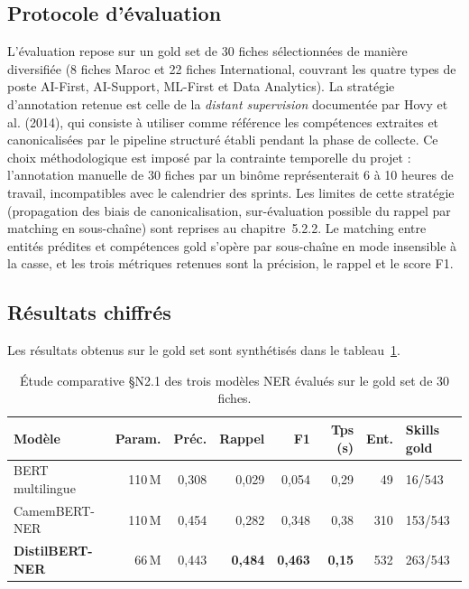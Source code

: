 \documentclass[11pt,a4paper,openany]{report}
\begin{document}
\subsection{Protocole d'\'evaluation}

L'\'evaluation repose sur un gold set de 30 fiches s\'electionn\'ees de mani\`ere diversifi\'ee (8 fiches Maroc et 22 fiches International, couvrant les quatre types de poste AI-First, AI-Support, ML-First et Data Analytics). La strat\'egie d'annotation retenue est celle de la \emph{distant supervision} document\'ee par Hovy et al. (2014), qui consiste \`a utiliser comme r\'ef\'erence les comp\'etences extraites et canonicalis\'ees par le pipeline structur\'e \'etabli pendant la phase de collecte. Ce choix m\'ethodologique est impos\'e par la contrainte temporelle du projet : l'annotation manuelle de 30 fiches par un bin\^ome repr\'esenterait 6 \`a 10 heures de travail, incompatibles avec le calendrier des sprints. Les limites de cette strat\'egie (propagation des biais de canonicalisation, sur-\'evaluation possible du rappel par matching en sous-cha\^ine) sont reprises au chapitre~5.2.2. Le matching entre entit\'es pr\'edites et comp\'etences gold s'op\`ere par sous-cha\^ine en mode insensible \`a la casse, et les trois m\'etriques retenues sont la pr\'ecision, le rappel et le score F1.

\subsection{R\'esultats chiffr\'es}

Les r\'esultats obtenus sur le gold set sont synth\'etis\'es dans le tableau~\ref{tab:ner-results}.

\begin{table}[H]
  \centering
  \caption{\'Etude comparative \S N2.1 des trois mod\`eles NER \'evalu\'es sur le gold set de 30 fiches.}
  \label{tab:ner-results}
  \small
  \begin{tabular}{lrrrrrrl}
    \toprule
    \rowcolor{softblue}\textbf{Mod\`ele} & \textbf{Param.} & \textbf{Pr\'ec.} & \textbf{Rappel} & \textbf{F1} & \textbf{Tps (s)} & \textbf{Ent.} & \textbf{Skills gold} \\
    \midrule
    BERT multilingue & 110\,M & 0,308 & 0,029 & 0,054 & 0,29 & 49 & 16/543 \\
    CamemBERT-NER & 110\,M & 0,454 & 0,282 & 0,348 & 0,38 & 310 & 153/543 \\
    \textbf{DistilBERT-NER} & 66\,M & 0,443 & \textbf{0,484} & \textbf{0,463} & \textbf{0,15} & 532 & 263/543 \\
    \bottomrule
  \end{tabular}
\end{table}
\end{document}
